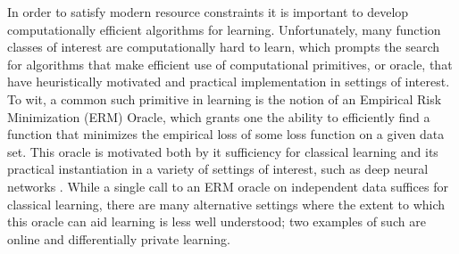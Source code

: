 

In order to satisfy modern resource constraints it is important to develop computationally efficient algorithms for learning.  Unfortunately, many function classes of interest are computationally hard to learn, which prompts the search for algorithms that make efficient use of computational primitives, or oracle, that have heuristically motivated and practical implementation in settings of interest.  To wit, a common such primitive in learning is the notion of an Empirical Risk Minimization (ERM) Oracle, which grants one the ability to efficiently find a function that minimizes the empirical loss of some loss function on a given data set.  This oracle is motivated both by it sufficiency for classical learning \citep[Chapter 4]{shai} and its practical instantiation in a variety of settings of interest, such as deep neural networks \citep{lecun2015deep}.  
While a single call to an ERM oracle on independent data suffices for classical learning, there are many alternative settings where the extent to which this oracle can aid learning is less well understood; two examples of such are online and differentially private learning.

